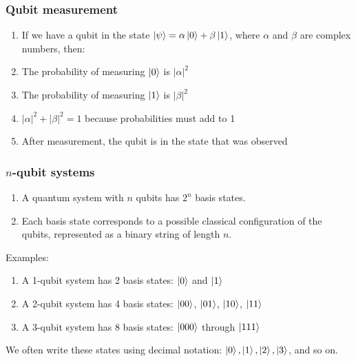 \documentclass{beamer}
\begin{document}
\begin{frame}
\frametitle{Qubit measurement}
\begin{enumerate}
    \item If we have a qubit in the state $\left| \psi \right\rangle = \alpha \left| 0 \right\rangle + \beta \left| 1 \right\rangle$, where $\alpha$ and $\beta$ are complex numbers, then:
    \item The probability of measuring $\left| 0 \right\rangle$ is $|\alpha|^2$
    \item The probability of measuring $\left| 1 \right\rangle$ is $|\beta|^2$
    \item $|\alpha|^2 + |\beta|^2 = 1$ because probabilities must add to 1
    \item After measurement, the qubit is in the state that was observed
\end{enumerate}

\end{frame}



\begin{frame}
\frametitle{$n$-qubit systems}
\begin{enumerate}

    \item A quantum system with $n$ qubits has $2^n$ basis states.
    \item Each basis state corresponds to a possible classical configuration of the qubits,
    represented as a binary string of length $n$.

\end{enumerate}

Examples:

\begin{enumerate}
    \item A 1-qubit system has 2 basis states: $\left| 0 \right\rangle$ and $\left| 1 \right\rangle$
    \item A 2-qubit system has 4 basis states: $\left| 00 \right\rangle$, $\left| 01 \right\rangle$, $\left| 10 \right\rangle$, $\left| 11 \right\rangle$
    \item A 3-qubit system has 8 basis states: $\left| 000 \right\rangle$ through $\left| 111 \right\rangle$
\end{enumerate}

\vskip 0.5cm

We often write these states using decimal notation: $\left| 0 \right\rangle, \left| 1 \right\rangle, \left| 2 \right\rangle, \left| 3 \right\rangle$, and so on.


\end{frame}
\end{document}
